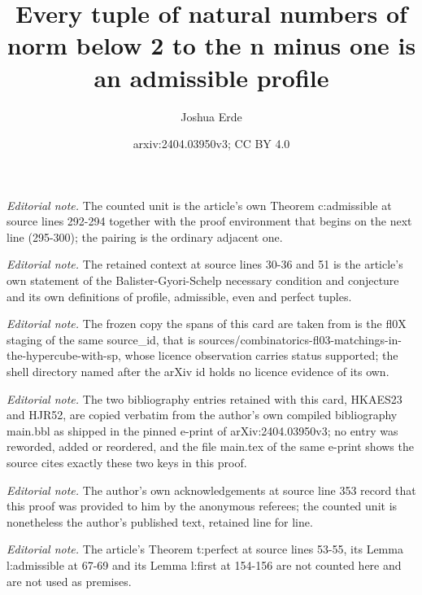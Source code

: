 \documentclass{article}
\title{Every tuple of natural numbers of norm below 2 to the n minus one is an admissible profile}
\author{Joshua Erde}
\date{arxiv:2404.03950v3; CC BY 4.0}
\begin{document}
\maketitle
\noindent\textit{Editorial note.} The counted unit is the article's own Theorem c:admissible at source lines 292-294 together with the proof environment that begins on the next line (295-300); the pairing is the ordinary adjacent one.\par\medskip
\noindent\textit{Editorial note.} The retained context at source lines 30-36 and 51 is the article's own statement of the Balister-Gyori-Schelp necessary condition and conjecture and its own definitions of profile, admissible, even and perfect tuples.\par\medskip
\noindent\textit{Editorial note.} The frozen copy the spans of this card are taken from is the fl0X staging of the same source\_id, that is sources/combinatorics-fl03-matchings-in-the-hypercube-with-sp, whose licence observation carries status supported; the shell directory named after the arXiv id holds no licence evidence of its own.\par\medskip
\noindent\textit{Editorial note.} The two bibliography entries retained with this card, HKAES23 and HJR52, are copied verbatim from the author's own compiled bibliography main.bbl as shipped in the pinned e-print of arXiv:2404.03950v3; no entry was reworded, added or reordered, and the file main.tex of the same e-print shows the source cites exactly these two keys in this proof.\par\medskip
\noindent\textit{Editorial note.} The author's own acknowledgements at source line 353 record that this proof was provided to him by the anonymous referees; the counted unit is nonetheless the author's published text, retained line for line.\par\medskip
\noindent\textit{Editorial note.} The article's Theorem t:perfect at source lines 53-55, its Lemma l:admissible at 67-69 and its Lemma l:first at 154-156 are not counted here and are not used as premises.\par\medskip
\end{document}
